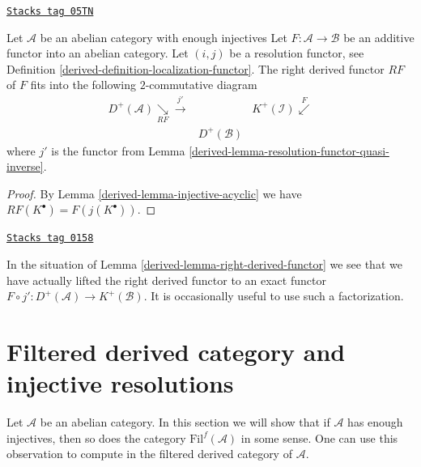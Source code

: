 \begin{lemma}
\label{derived-lemma-right-derived-functor}
\href{https://stacks.math.columbia.edu/tag/05TN}{\texttt{Stacks tag 05TN}}

Let $\mathcal{A}$ be an abelian category with enough injectives
Let $F : \mathcal{A} \to \mathcal{B}$ be an additive functor into
an abelian category. Let $(i, j)$ be a resolution functor, see
Definition \ref{derived-definition-localization-functor}.
The right derived functor $RF$ of $F$ fits into the following
$2$-commutative diagram
$$
\begin{array}{ccc}D^{+}(\mathcal{A}) \underset{RF}{\searrow}\overset{j'}{\longrightarrow} &  & K^{+}(\mathcal{I}) \overset{F}{\swarrow} \\  & D^{+}(\mathcal{B}) & \end{array}
$$
where $j'$ is the functor from
Lemma \ref{derived-lemma-resolution-functor-quasi-inverse}.
\end{lemma}

\begin{proof}

By
Lemma \ref{derived-lemma-injective-acyclic}
we have $RF(K^\bullet) = F(j(K^\bullet))$.
\end{proof}

\begin{remark}
\label{derived-remark-right-derived-functor}
\href{https://stacks.math.columbia.edu/tag/0158}{\texttt{Stacks tag 0158}}

In the situation of
Lemma \ref{derived-lemma-right-derived-functor}
we see that we have actually lifted the right derived
functor to an exact functor
$F \circ j' : D^{+}(\mathcal{A}) \to K^{+}(\mathcal{B})$.
It is occasionally useful to use such a factorization.
\end{remark}

\section{Filtered derived category and injective resolutions}
\label{derived-section-filtered-derived}
Let $\mathcal{A}$ be an abelian category. In this section we will show
that if $\mathcal{A}$ has enough injectives, then so does
the category $\text{Fil}^f(\mathcal{A})$ in some sense. One
can use this observation to compute in the filtered derived category
of $\mathcal{A}$.

